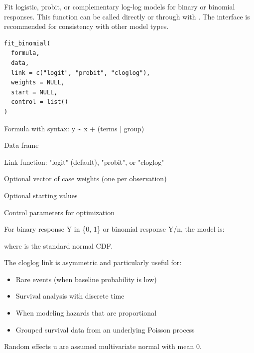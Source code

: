 \documentclass[a4paper]{book}
\begin{document}
%
\begin{Description}
Fit logistic, probit, or complementary log-log models for binary or binomial
responses. This function can be called directly or through  with
. The  interface is recommended
for consistency with other model types.
\end{Description}
%
\begin{Usage}
\begin{verbatim}
fit_binomial(
  formula,
  data,
  link = c("logit", "probit", "cloglog"),
  weights = NULL,
  start = NULL,
  control = list()
)
\end{verbatim}
\end{Usage}
%
\begin{Arguments}
\begin{ldescription}
\item[\code{formula}] Formula with syntax: y \textasciitilde{} x + (terms | group)

\item[\code{data}] Data frame

\item[\code{link}] Link function: "logit" (default), "probit", or "cloglog"

\item[\code{weights}] Optional vector of case weights (one per observation)

\item[\code{start}] Optional starting values

\item[\code{control}] Control parameters for optimization
\end{ldescription}
\end{Arguments}
%
\begin{Details}
For binary response Y in \{0, 1\} or binomial response Y/n, the model is:


where \eqn{\Phi}{} is the standard normal CDF.


The cloglog link is asymmetric and particularly useful for:
\begin{itemize}

\item{} Rare events (when baseline probability is low)
\item{} Survival analysis with discrete time
\item{} When modeling hazards that are proportional
\item{} Grouped survival data from an underlying Poisson process

\end{itemize}


Random effects u are assumed multivariate normal with mean 0.
\end{Details}
\end{document}
